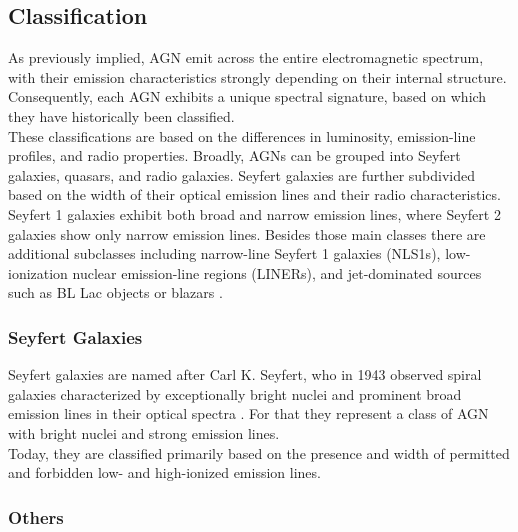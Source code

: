 \subsection{Classification}
\label{sec:classification}
As previously implied, AGN emit across the entire electromagnetic spectrum, with their emission characteristics strongly depending on their internal structure. Consequently, each AGN exhibits a unique spectral signature, based on which they have historically been classified.\\
These classifications are based on the differences in luminosity, emission-line profiles, and radio properties. Broadly, AGNs can be grouped into Seyfert galaxies, quasars, and radio galaxies. Seyfert galaxies are further subdivided based on the width of their optical emission lines and their radio characteristics. Seyfert 1 galaxies exhibit both broad and narrow emission lines, where Seyfert 2 galaxies show only narrow emission lines. Besides those main classes there are additional subclasses including narrow-line Seyfert 1 galaxies (NLS1s), low-ionization nuclear emission-line regions (LINERs), and jet-dominated sources such as BL Lac objects or blazars \parencite{antonucci1993unified, urry1995unified}.

\subsubsection{Seyfert Galaxies}

Seyfert galaxies are named after Carl K. Seyfert, who in 1943 observed spiral galaxies characterized by exceptionally bright nuclei and prominent broad emission lines in their optical spectra \parencite{seyfert1943nuclear}. For that they represent a class of AGN with bright nuclei and strong emission lines. \\
Today, they are classified primarily based on the presence and width of permitted and forbidden low- and high-ionized emission lines.



\subsubsection{Others}



